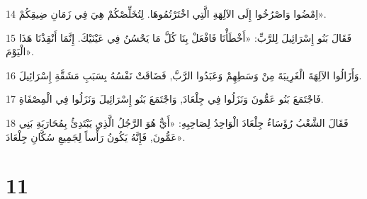 \par 14 اِمْضُوا وَاصْرُخُوا إِلَى الآلِهَةِ الَّتِي اخْتَرْتُمُوهَا. لِتُخَلِّصْكُمْ هِيَ فِي زَمَانِ ضِيقِكُمْ».
\par 15 فَقَالَ بَنُو إِسْرَائِيلَ لِلرَّبِّ: «أَخْطَأْنَا فَافْعَلْ بِنَا كُلَّ مَا يَحْسُنُ فِي عَيْنَيْكَ. إِنَّمَا أَنْقِذْنَا هَذَا الْيَوْمَ».
\par 16 وَأَزَالُوا الآلِهَةَ الْغَرِيبَةَ مِنْ وَسَطِهِمْ وَعَبَدُوا الرَّبَّ, فَضَاقَتْ نَفْسُهُ بِسَبَبِ مَشَقَّةِ إِسْرَائِيلَ.
\par 17 فَاجْتَمَعَ بَنُو عَمُّونَ وَنَزَلُوا فِي جِلْعَادَ, وَاجْتَمَعَ بَنُو إِسْرَائِيلَ وَنَزَلُوا فِي الْمِصْفَاةِ.
\par 18 فَقَالَ الشَّعْبُ رُؤَسَاءُ جِلْعَادَ الْوَاحِدُ لِصَاحِبِهِ: «أَيٌّ هُوَ الرَّجُلُ الَّذِي يَبْتَدِئُ بِمُحَارَبَةِ بَنِي عَمُّونَ, فَإِنَّهُ يَكُونُ رَأْساً لِجَمِيعِ سُكَّانِ جِلْعَادَ».

\chapter{11}

